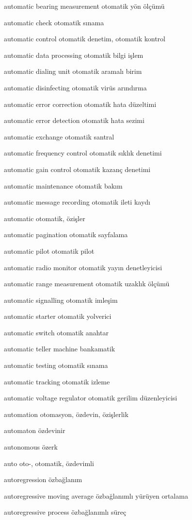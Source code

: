 \documentclass[12pt,fleqn]{article}\usepackage{../../common}
\begin{document}
automatic bearing measurement otomatik yön ölçümü

automatic check otomatik sınama

automatic control otomatik denetim, otomatik kontrol

automatic data processing otomatik bilgi işlem

automatic dialing unit otomatik aramalı birim

automatic disinfecting otomatik virüs arındırma

automatic error correction otomatik hata düzeltimi

automatic error detection otomatik hata sezimi

automatic exchange otomatik santral

automatic frequency control otomatik sıklık denetimi

automatic gain control otomatik kazanç denetimi

automatic maintenance otomatik bakım

automatic message recording otomatik ileti kaydı

automatic otomatik, özişler

automatic pagination otomatik sayfalama

automatic pilot otomatik pilot

automatic radio monitor otomatik yayın denetleyicisi

automatic range measurement otomatik uzaklık ölçümü

automatic signalling otomatik imleşim

automatic starter otomatik yolverici

automatic switch otomatik anahtar

automatic teller machine bankamatik

automatic testing otomatik sınama

automatic tracking otomatik izleme

automatic voltage regulator otomatik gerilim düzenleyicisi

automation otomasyon, özdevin, özişlerlik

automaton özdevinir

autonomous özerk

auto oto-, otomatik, özdevimli

autoregression özbağlanım

autoregressive moving average özbağlanımlı yürüyen ortalama

autoregressive process özbağlanımlı süreç
\end{document}
